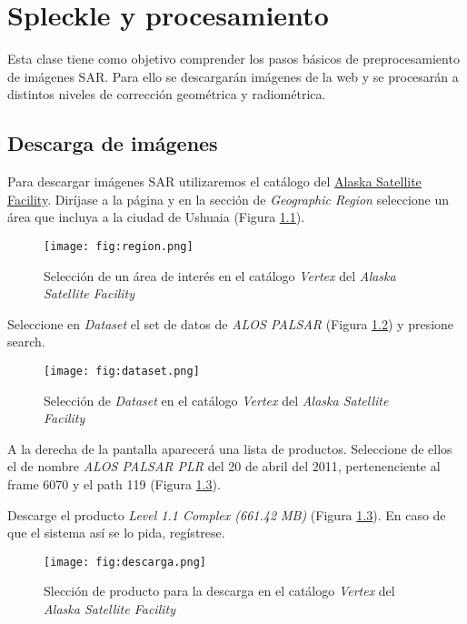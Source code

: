 \chapter{Spleckle y procesamiento}

Esta clase tiene como objetivo comprender los pasos básicos de preprocesamiento de imágenes SAR. Para ello se descargarán imágenes de la web y se procesarán a distintos niveles de corrección geométrica y radiométrica.

\section{Descarga de imágenes}

Para descargar imágenes SAR utilizaremos el catálogo del \href{https://vertex.daac.asf.alaska.edu/}{Alaska Satellite Facility}. Diríjase a la página y en la sección de \emph{Geographic Region} seleccione un área que incluya a la ciudad de Ushuaia (Figura \ref{fig:region}).

\begin{figure}[h!]
    \centering
    \texttt{[image: fig:region.png]}
    \caption{Selección de un área de interés en el catálogo \emph{Vertex} del \emph{Alaska Satellite Facility}}
    \label{fig:region}
\end{figure}

Seleccione en \emph{Dataset} el set de datos de \emph{ALOS PALSAR} (Figura \ref{fig:dataset}) y presione search.

\begin{figure}[h!]
    \centering
    \texttt{[image: fig:dataset.png]}
    \caption{Selección de \emph{Dataset} en el catálogo \emph{Vertex} del \emph{Alaska Satellite Facility}}
    \label{fig:dataset}
\end{figure}

A la derecha de la pantalla aparecerá una lista de productos. Seleccione de ellos el de nombre \emph{ALOS PALSAR PLR} del 20 de abril del 2011, pertenenciente al frame 6070 y el path 119 (Figura \ref{fig:descarga}).

Descarge el producto \emph{Level 1.1 Complex (661.42 MB)} (Figura \ref{fig:descarga}). En caso de que el sistema así se lo pida, regístrese.

\begin{figure}[h!]
    \centering
    \texttt{[image: fig:descarga.png]}
    \caption{Slección de producto para la descarga en el catálogo \emph{Vertex} del \emph{Alaska Satellite Facility}}
    \label{fig:descarga}
\end{figure}

